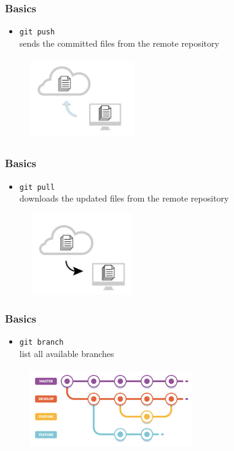 \documentclass{beamer}
\begin{document}
\begin{frame}[fragile]
\frametitle{Basics}
\begin{itemize}
\item \verb!git push! \\ 
sends the committed files from the remote repository
\end{itemize}
\begin{figure}
\centering
\includegraphics[height=3.5cm, width=4.5cm]{push}
\end{figure}
\end{frame}

\begin{frame}[fragile]
\frametitle{Basics}
\begin{itemize}
\item \verb!git pull! \\ 
downloads the updated files from the remote repository
\end{itemize}
\begin{figure}
\centering
\includegraphics[height=3.5cm, width=4.5cm]{pull}
\end{figure}
\end{frame}

\begin{frame}[fragile]
\frametitle{Basics}
\begin{itemize}
\item \verb!git branch! \\ 
list all available branches
\end{itemize}
\begin{figure}
\centering
\includegraphics[height=3.5cm, width=7cm]{branching}
\end{figure}
\end{frame}
\end{document}
